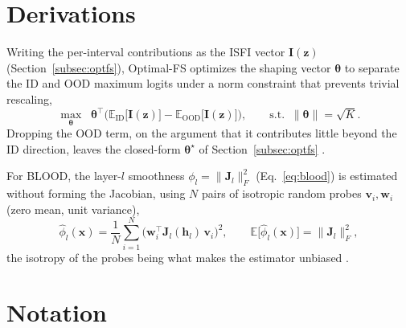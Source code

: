 \documentclass[a4paper]{article}
\begin{document}


\newpage

\appendix


\section{Derivations}
\label{app:derivations}

Writing the per-interval contributions as the ISFI vector $\mathbf{I}(\mathbf{z})$
(Section~\ref{subsec:optfs}), Optimal-FS optimizes the shaping vector
$\boldsymbol{\theta}$ to separate the ID and OOD maximum logits under a norm constraint
that prevents trivial rescaling,
\begin{equation}
\max_{\boldsymbol{\theta}} \;\;
\boldsymbol{\theta}^{\top}
\Big( \mathbb{E}_{\mathrm{ID}}\big[\mathbf{I}(\mathbf{z})\big]
- \mathbb{E}_{\mathrm{OOD}}\big[\mathbf{I}(\mathbf{z})\big] \Big),
\qquad \text{s.t.} \;\; \|\boldsymbol{\theta}\| = \sqrt{K}.
\end{equation}
Dropping the OOD term, on the argument that it contributes little beyond the ID
direction, leaves the closed-form $\boldsymbol{\theta}^{\star}$ of
Section~\ref{subsec:optfs} \cite{optimalfs}.


For BLOOD, the layer-$l$ smoothness $\phi_l = \|\mathbf{J}_l\|_F^{2}$
(Eq.~\ref{eq:blood}) is estimated without forming the Jacobian, using $N$ pairs of
isotropic random probes $\mathbf{v}_i, \mathbf{w}_i$ (zero mean, unit variance),
\begin{equation}
\hat{\phi}_l(\mathbf{x}) = \frac{1}{N} \sum_{i=1}^{N}
\big( \mathbf{w}_i^{\top} \mathbf{J}_l(\mathbf{h}_l)\, \mathbf{v}_i \big)^{2},
\qquad
\mathbb{E}\big[\hat{\phi}_l(\mathbf{x})\big] = \big\| \mathbf{J}_l \big\|_F^{2},
\end{equation}
the isotropy of the probes being what makes the estimator unbiased \cite{blood}.

\newpage
\section{Notation}


\end{document}
